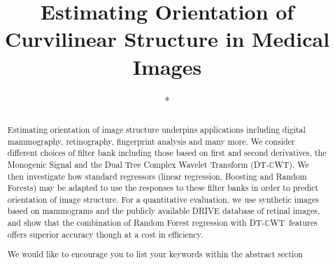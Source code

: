 \documentclass[runningheads,a4paper]{llncs}
\newcommand{\keywords}[1]{\par\addvspace\baselineskip
\noindent\keywordname\enspace\ignorespaces#1}
\def\dtcwt{DT-$\mathbb{C}$WT}
\begin{document}
\mainmatter  %

\title{Estimating Orientation of Curvilinear Structure in Medical Images}


%
%
\author{*}%
%

\institute{*}

%
%

\tocauthor{ }
\maketitle


\begin{abstract}
Estimating orientation of image structure underpins applications including digital mammography, retinography, fingerprint analysis and many more. We consider different choices of filter bank including those based on first and second derivatives, the Monogenic Signal and the Dual Tree Complex Wavelet Transform (\dtcwt). We then investigate how standard regressors (linear regression, Boosting and Random Forests) may be adapted to use the responses to these filter banks in order to predict orientation of image structure. For a quantitative evaluation, we use synthetic images based on mammograms and the publicly available DRIVE database of retinal images, and show that the combination of Random Forest regression with \dtcwt~features offers superior accuracy though at a cost in efficiency.
\keywords{We would like to encourage you to list your keywords within
the abstract section}
\end{abstract}
\end{document}
